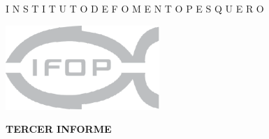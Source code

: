 \documentclass[12pt, oneside]{article} %
\renewcommand{\baselinestretch}{1.2}
\begin{document}
\begin{titlepage}

\renewcommand{\baselinestretch}{1.3}
\null
\large
\begin{center}
\fontsize{12pt}{8pt}\selectfont
{}\uppercase\expandafter{}  I \hspace{0.3pt} N  \hspace{0.3pt} S  \hspace{0.3pt}  T \hspace{0.3pt}   I \hspace{0.3pt}    T \hspace{0.3pt}    U   \hspace{0.3pt}  T  \hspace{0.3pt}  O \hspace{20pt} D  \hspace{0.3pt}  E \hspace{20pt}  F   \hspace{0.3pt} O  \hspace{0.3pt}  M \hspace{0.3pt}   E \hspace{0.3pt}   N  \hspace{0.3pt}  T \hspace{0.3pt}   O  \hspace{20pt}  P \hspace{0.3pt}   E  \hspace{0.3pt}  S \hspace{0.3pt}   Q   \hspace{0.3pt} U  \hspace{0.3pt}  E \hspace{0.3pt}   R  \hspace{0.3pt}  O 
\end{center}
\normalsize


 \hfill  \includegraphics[height=3.2cm]{Figuras/logoIFOPgris_Portada.pdf}

\vspace*{0.5cm} 

\centering \fontsize{14pt}{8pt}\selectfont
            \vspace*{1mm} 
            \hfill \textbf{TERCER INFORME}
        

\end{titlepage}
\end{document}

